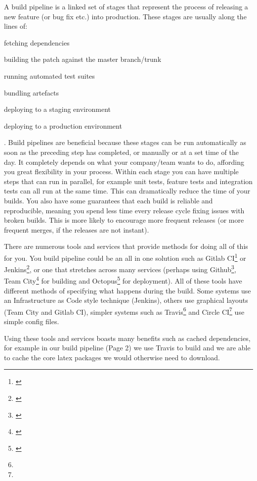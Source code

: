 A build pipeline is a linked set of stages that represent the process of releasing a new feature (or bug fix etc.) into production.
These stages are usually along the lines of:
\begin{itemize*}
  \item fetching dependencies
  \item building the patch against the master branch/trunk
  \item running automated test suites
  \item bundling artefacts
  \item deploying to a staging environment
  \item deploying to a production environment
\end{itemize*}.
Build pipelines are beneficial because these stages can be run automatically as soon as the preceding step has completed,
or manually or at a set time of the day.
It completely depends on what your company/team wants to do, affording you great flexibility in your process.
Within each stage you can have multiple steps that can run in parallel,
for example unit tests, feature tests and integration tests can all run at the same time.
This can dramatically reduce the time of your builds.
You also have some guarantees that each build is reliable and reproducible,
meaning you spend less time every release cycle fixing issues with broken builds.
This is more likely to encourage more frequent releases (or more frequent merges, if the releases are not instant).
\par
There are numerous tools and services that provide methods for doing all of this for you.
You build pipeline could be an all in one solution such as Gitlab CI\footnote{\label{gitlab-ci}} or Jenkins\footnote{\label{jenkins}},
or one that stretches across many services (perhaps using Github\footnote{\label{github}}, Team City\footnote{\label{team-city}} for building and Octopus\footnote{\label{octopus}} for deployment).
All of these tools have different methods of specifying what happens during the build.
Some systems use an Infrastructure as Code style technique (Jenkins),
others use graphical layouts (Team City and Gitlab CI),
simpler systems such as Travis\footnote{} and Circle CI\footnote{} use simple config files.
\par
Using these tools and services boasts many benefits such as cached dependencies,
for example in our build pipeline (Page 2) we use Travis to build and we are able to cache the core latex packages we would otherwise need to download.
